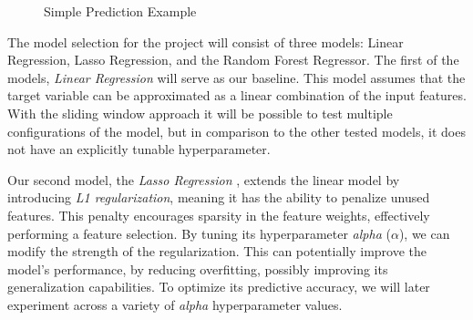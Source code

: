 \documentclass[12pt]{report} %
\begin{document}
\begin{figure}[H]
    \centering
    \caption{Simple Prediction Example}
    \label{fig:pred_example}
\end{figure}

The model selection for the project will consist of three models: Linear Regression, Lasso Regression, and the Random Forest Regressor. The first of the models, \textit{Linear Regression} \cite{linear_regression} will serve as our baseline. This model assumes that the target variable can be approximated as a linear combination of the input features. With the sliding window approach it will be possible to test multiple configurations of the model, but in comparison to the other tested models, it does not have an explicitly tunable hyperparameter.

Our second model, the \textit{Lasso Regression} \cite{lasso_regression}, extends the linear model by introducing \textit{L1 regularization}, meaning it has the ability to penalize unused features. This penalty encourages sparsity in the feature weights, effectively performing a feature selection. By tuning its hyperparameter \textit{alpha} ($\alpha$), we can modify the strength of the regularization. This can potentially improve the model's performance, by reducing overfitting, possibly improving its generalization capabilities. To optimize its predictive accuracy, we will later experiment across a variety of \textit{alpha} hyperparameter values.
\end{document}
